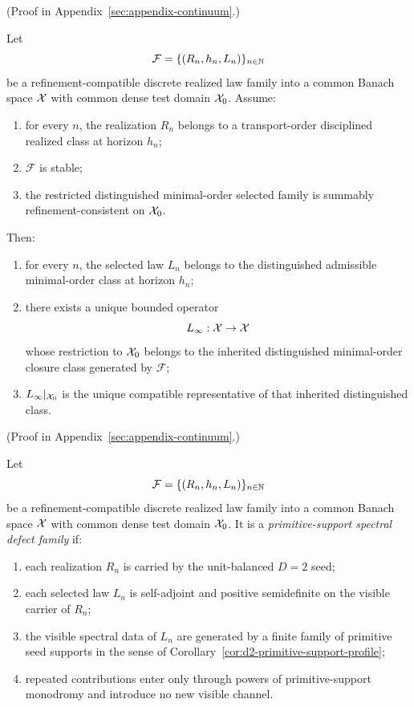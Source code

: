 (Proof in Appendix~\ref{sec:appendix-continuum}.)

\begin{corollary}
\label{cor:inherited-minimal-order-closure-class}
Let
\[
\mathcal F=\{(R_n,h_n,L_n)\}_{n\in\mathbb{N}}
\]
be a refinement-compatible discrete realized law family into a common Banach
space \(\mathcal{X}\) with common dense test domain \(\mathcal{X}_0\). Assume:
\begin{enumerate}[label=(\roman*), leftmargin=2em, itemsep=0.2em]
\item for every \(n\), the realization \(R_n\) belongs to a transport-order
      disciplined realized class at horizon \(h_n\);
\item \(\mathcal F\) is stable;
\item the restricted distinguished minimal-order selected family is summably
      refinement-consistent on \(\mathcal{X}_0\).
\end{enumerate}
Then:
\begin{enumerate}[label=(\alph*), leftmargin=2em, itemsep=0.2em]
\item for every \(n\), the selected law \(L_n\) belongs to the distinguished
      admissible minimal-order class at horizon \(h_n\);
\item there exists a unique bounded operator
      \[
      L_\infty:\mathcal{X}\to\mathcal{X}
      \]
      whose restriction to \(\mathcal{X}_0\) belongs to the inherited distinguished
      minimal-order closure class generated by \(\mathcal F\);
\item \(L_\infty|_{\mathcal{X}_0}\) is the unique compatible representative of that
      inherited distinguished class.
\end{enumerate}
\end{corollary}

(Proof in Appendix~\ref{sec:appendix-continuum}.)

\begin{definition}
\label{def:primitive-support-spectral-defect-family}
Let
\[
\mathcal F=\{(R_n,h_n,L_n)\}_{n\in\mathbb{N}}
\]
be a refinement-compatible discrete realized law family into a common Banach
space \(\mathcal{X}\) with common dense test domain \(\mathcal{X}_0\). It is a
\emph{primitive-support spectral defect family} if:
\begin{enumerate}[label=(\roman*), leftmargin=2em, itemsep=0.2em]
\item each realization \(R_n\) is carried by the unit-balanced \(D=2\) seed;
\item each selected law \(L_n\) is self-adjoint and positive semidefinite on
      the visible carrier of \(R_n\);
\item the visible spectral data of \(L_n\) are generated by a finite family of
      primitive seed supports in the sense of
      Corollary~\ref{cor:d2-primitive-support-profile};
\item repeated contributions enter only through powers of primitive-support
      monodromy and introduce no new visible channel.
\end{enumerate}
\end{definition}

